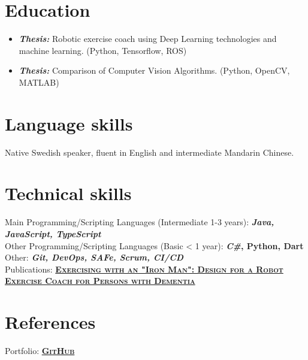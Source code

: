 \documentclass[11pt,a4paper,sans,colorlinks,linkcolor=blue,urlcolor=blue]{moderncv}
\begin{document}

\section{Education}
{\begin{itemize}
    \setlength{\itemindent}{.25in}
    \itemsep0.3em
    \item \textit{\textbf{Thesis:}} Robotic exercise coach using Deep Learning technologies and machine learning. (Python, Tensorflow, ROS)
\end{itemize}}



{\begin{itemize}
    \setlength{\itemindent}{.25in}
    \itemsep0.3em
    \item \textit{\textbf{Thesis:}} Comparison of Computer Vision Algorithms. (Python, OpenCV, MATLAB)
\end{itemize}}

\section{Language skills}
Native Swedish speaker, fluent in English and intermediate Mandarin Chinese.
\section{Technical skills}
{Main Programming/Scripting Languages (Intermediate 1-3 years): \textbf{\textit{Java, JavaScript, TypeScript}}}
\\
{Other Programming/Scripting Languages (Basic < 1 year): \textbf{\textit{C\#}, Python, Dart}}
\\
Other: \textbf{\textit{Git, DevOps, SAFe, Scrum, CI/CD}}
\\
Publications: \href{https://arxiv.org/abs/1909.12262}{\textbf{\textsc{Exercising with an "Iron Man": Design for a Robot Exercise Coach for Persons with Dementia}}}

\section{References}
Portfolio: \href{https://github.com/jacobpihl}{\textbf{\textsc{GitHub}}}
\end{document}
